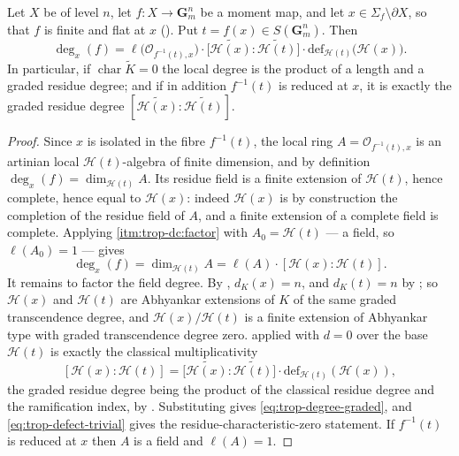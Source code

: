 \begin{theorem}
\label{thm:trop-degree-graded}
Let $X$ be of level $n$, let $f:X\to\mathbf G_m^n$ be a moment map, and let
$x\in\Sigma_f\setminus\partial X$, so that $f$ is finite and flat at $x$
(). Put $t=f(x)\in S(\mathbf G_m^n)$. Then
\begin{equation}
\label{eq:trop-degree-graded}
 \deg_x(f)
 =\ell\bigl(\mathcal O_{f^{-1}(t),x}\bigr)\cdot
  \bigl[\widetilde{\mathcal H(x)}:\widetilde{\mathcal H(t)}\bigr]\cdot
  \mathrm{def}_{\mathcal H(t)}\bigl(\mathcal H(x)\bigr).
\end{equation}
In particular, if $\operatorname{char}\widetilde K=0$ the local degree is the
product of a length and a graded residue degree; and if in addition
$f^{-1}(t)$ is reduced at $x$, it is exactly the graded residue degree
$[\widetilde{\mathcal H(x)}:\widetilde{\mathcal H(t)}]$.
\end{theorem}

\begin{proof}
Since $x$ is isolated in the fibre $f^{-1}(t)$, the local ring
$A=\mathcal O_{f^{-1}(t),x}$ is an artinian local
$\mathcal H(t)$-algebra of finite dimension, and by definition
$\deg_x(f)=\dim_{\mathcal H(t)}A$. Its residue field is a finite extension
of $\mathcal H(t)$, hence complete, hence equal to $\mathcal H(x)$: indeed
$\mathcal H(x)$ is by construction the completion of the residue field of
$A$, and a finite extension of a complete field is complete. Applying
 \cref{itm:trop-dc:factor} with
$A_0=\mathcal H(t)$ --- a field, so $\ell(A_0)=1$ --- gives
\[
 \deg_x(f)=\dim_{\mathcal H(t)}A
 =\ell(A)\cdot[\mathcal H(x):\mathcal H(t)].
\]
It remains to factor the field degree. By
, $d_K(x)=n$, and $d_K(t)=n$ by
; so $\mathcal H(x)$ and $\mathcal H(t)$ are
Abhyankar extensions of $K$ of the same graded transcendence degree, and
$\mathcal H(x)/\mathcal H(t)$ is a finite extension of Abhyankar type with
graded transcendence degree zero.  applied
with $d=0$ over the base $\mathcal H(t)$ is exactly the classical
multiplicativity
\[
 [\mathcal H(x):\mathcal H(t)]
 =\bigl[\widetilde{\mathcal H(x)}:\widetilde{\mathcal H(t)}\bigr]\cdot
  \mathrm{def}_{\mathcal H(t)}(\mathcal H(x)),
\]
the graded residue degree being the product of the classical residue degree
and the ramification index, by . Substituting
gives \eqref{eq:trop-degree-graded}, and
\eqref{eq:trop-defect-trivial} gives the residue-characteristic-zero
statement. If $f^{-1}(t)$ is reduced at $x$ then $A$ is a field and
$\ell(A)=1$.
\end{proof}

